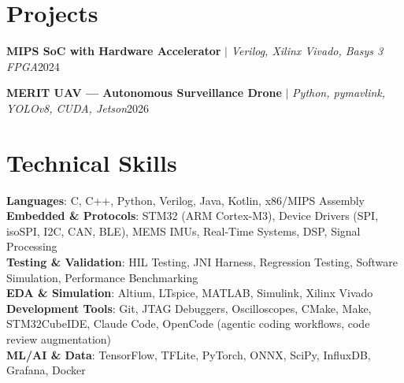 \documentclass[letterpaper,11pt]{article}
\begin{document}
\section{Projects}
    \resumeSubHeadingListStart
 
      \resumeProjectHeading
          {\textbf{MIPS SoC with Hardware Accelerator} $|$ \emph{Verilog, Xilinx Vivado, Basys 3 FPGA}}{2024}
          \resumeItemListStart
            
          \resumeItemListEnd
 
      \resumeProjectHeading
          {\textbf{MERIT UAV --- Autonomous Surveillance Drone} $|$ \emph{Python, pymavlink, YOLOv8, CUDA, Jetson}}{2026}
          \resumeItemListStart

            
          \resumeItemListEnd 
 
    \resumeSubHeadingListEnd
 
\section{Technical Skills}
 \resumeSubHeadingListStart
    \small{\item{
     \textbf{Languages}{: C, C++, Python, Verilog, Java, Kotlin, x86/MIPS Assembly} \\
     \textbf{Embedded \& Protocols}{: STM32 (ARM Cortex-M3), Device Drivers (SPI, isoSPI, I2C, CAN, BLE), MEMS IMUs, Real-Time Systems, DSP, Signal Processing} \\
     \textbf{Testing \& Validation}{: HIL Testing, JNI Harness, Regression Testing, Software Simulation, Performance Benchmarking} \\
     \textbf{EDA \& Simulation}{: Altium, LTspice, MATLAB, Simulink, Xilinx Vivado} \\
     \textbf{Development Tools}{: Git, JTAG Debuggers, Oscilloscopes, CMake, Make, STM32CubeIDE, Claude Code, OpenCode (agentic coding workflows, code review augmentation)} \\
     \textbf{ML/AI \& Data}{: TensorFlow, TFLite, PyTorch, ONNX, SciPy, InfluxDB, Grafana, Docker}
    }}
 \resumeSubHeadingListEnd
 
\end{document}

